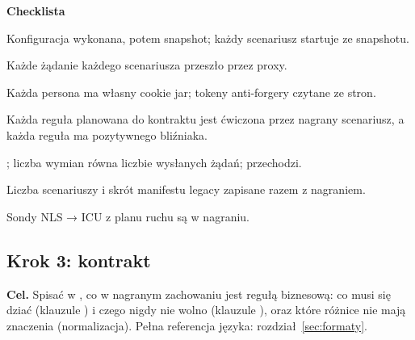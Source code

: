 \textbf{Checklista}
\begin{checklista}
  \item Konfiguracja wykonana, potem snapshot; każdy scenariusz startuje ze snapshotu.
  \item Każde żądanie każdego scenariusza przeszło przez proxy.
  \item Każda persona ma własny cookie jar; tokeny anti-forgery czytane ze stron.
  \item Każda reguła planowana do kontraktu jest ćwiczona przez nagrany scenariusz, a
        każda reguła  ma pozytywnego bliźniaka.
  \item {}; liczba wymian równa liczbie wysłanych żądań;
         przechodzi.
  \item Liczba scenariuszy i skrót manifestu legacy zapisane razem z nagraniem.
  \item Sondy NLS → ICU z planu ruchu są w nagraniu.
\end{checklista}


\subsection{Krok 3: kontrakt}\label{sec:procedura-krok3}

\textbf{Cel.} Spisać w , co w nagranym zachowaniu jest regułą
biznesową: co musi się dziać (klauzule ) i czego nigdy nie wolno
(klauzule ), oraz które różnice nie mają znaczenia (normalizacja). Pełna
referencja języka: rozdział~\ref{sec:formaty}.

